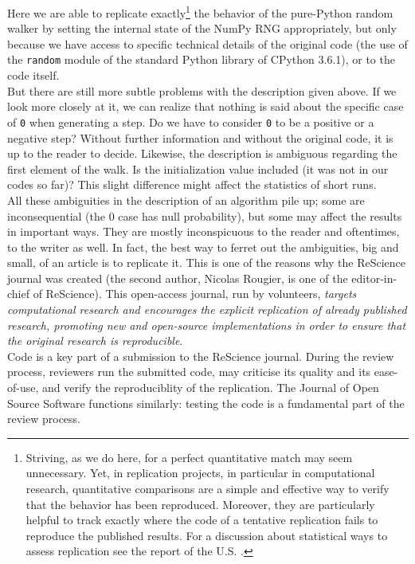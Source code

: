 \documentclass[a4paper,11pt]{article}
\begin{document}
Here we are able to replicate exactly\footnote{Striving, as we do here, for a perfect quantitative match may seem unnecessary. Yet, in replication projects, in particular in computational research, quantitative comparisons are a simple and effective way to verify that the behavior has been reproduced. Moreover, they are particularly helpful to track exactly where the code of a tentative replication fails to reproduce the published results. For a discussion about statistical ways to assess replication see the report of the U.S. \cite{Schwalbe:2016}.} the behavior of the pure-Python random walker by setting the internal state of the NumPy RNG appropriately, but only because we have access to specific technical details of the original code (the use of the {\tt random} module of the standard Python library of CPython 3.6.1), or to the code itself.\\

But there are still more subtle problems with the description given above.
If we look more closely at it, we can realize
that nothing is said about the specific case of {\tt 0} when generating a step.
Do we have to consider {\tt 0} to be a positive or a negative step? Without
further information and without the original code, it is up to the reader to
decide. Likewise, the description is ambiguous regarding the first element of the walk. Is the initialization value included (it was not in our codes so far)? This slight difference might affect the statistics of short runs.\\

All these ambiguities in the description of an algorithm pile up; some are inconsequential (the 0 case has null probability), but some may affect the results in important ways. They are mostly inconspicuous to the reader and oftentimes, to the writer as well. In fact, the best way to ferret out the ambiguities, big and small, of an article is to replicate it. This is one of the reasons why the ReScience journal \citep{Rougier:2017} was created (the second author, Nicolas Rougier, is one of the editor-in-chief of ReScience). This open-access journal, run by volunteers, {\em targets computational research and encourages the explicit replication of already published research, promoting new and open-source implementations in order to ensure that the original research is reproducible}.\\

Code is a key part of a submission to the ReScience journal. During the review process, reviewers run the submitted code, may criticise its quality and its ease-of-use, and verify the reproduciblity of the replication. The Journal of Open Source Software \citep{Smith:2017} functions similarly: testing the code is a fundamental part of the review process.
\end{document}
